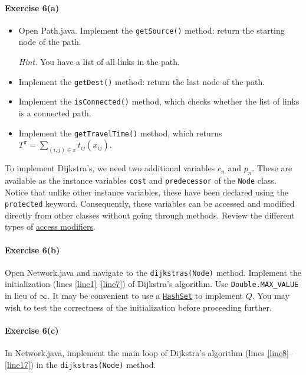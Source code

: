 \documentclass[11pt]{article}
\begin{document}
\paragraph*{Exercise 6(a)} \begin{itemize}
	\item Open Path.java. Implement the \texttt{getSource()} method: return the starting node of the path.
	
	\textit{Hint.} You have a list of all links in the path.
	
	\item Implement the \texttt{getDest()} method: return the last node of the path.
	\item Implement the \texttt{isConnected()} method, which checks whether the list of links is a connected path.
	\item Implement the \texttt{getTravelTime()} method, which returns $T^\pi = \sum_{(i,j)\in\pi} t_{ij}(x_{ij})$.
\end{itemize}


\vspace{\baselineskip}

\noindent
To implement Dijkstra's, we need two additional variables $c_n$ and $p_n$. These are available as the instance variables \texttt{cost} and \texttt{predecessor} of the \texttt{Node} class. Notice that unlike other instance variables, these have been declared using the \texttt{protected} keyword. Consequently, these variables can be accessed and modified directly from other classes without going through methods. Review the different types of \href{https://www.w3schools.com/java/java_modifiers.asp}{access modifiers}.


\paragraph*{Exercise 6(b)} Open Network.java and navigate to the \texttt{dijkstras(Node)} method. Implement the initialization (lines \ref{line1}--\ref{line7}) of Dijkstra's algorithm. Use \texttt{Double.MAX\_VALUE} in lieu of $\infty$. 
It may be convenient to use a \href{https://www.w3schools.com/java/java_hashset.asp}{\texttt{HashSet}} to implement $Q$. You may wish to test the correctness of the initialization before proceeding further. 


\paragraph*{Exercise 6(c)} In Network.java, implement the main loop of Dijkstra's algorithm (lines \ref{line8}--\ref{line17}) in the \texttt{dijkstras(Node)} method. 
\end{document}

